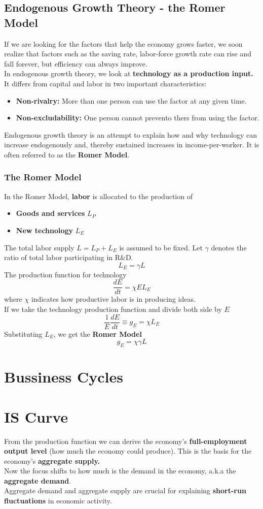 \documentclass[a4paper]{article}
\renewcommand{\sb}{\vspace*{5px} \\}
\begin{document}
\subsection{Endogenous Growth Theory - the Romer Model}
If we are looking for the factors that help the economy grows faster, we soon 
realize that factors such as the saving rate, labor-force growth rate can rise 
and fall forever, but efficiency can always improve. \sb
In endogenous growth theory, we look at \textbf{technology as a 
production input.} It differs from capital and labor in two important 
characteristics: \begin{itemize}
    \item \textbf{Non-rivalry: } More than one person can use the factor 
    at any given time.
    \item \textbf{Non-excludability: } One person cannot prevento thers 
    from using the factor.
\end{itemize}
Endogenous growth theory is an attempt to explain how 
and why technology can increase
endogenously and, thereby sustained increases in income-per-worker. 
It is often referred to as the \textbf{Romer Model}.
\pagebreak

\subsubsection*{The Romer Model}
In the Romer Model, \textbf{labor} is allocated to the production of \begin{itemize}
    \item \textbf{Goods and services} $L_P$
    \item \textbf{New technology} $L_E$
\end{itemize}
The total labor supply $L  = L_P + L_E$ is assumed to be fixed. Let $\gamma$ 
denotes the ratio of total labor participating in R\&D.
\[ L_E = \gamma L \]
The production function for technology
\[ \frac{dE}{dt} = \chi E L_E \]
where $\chi$ indicates how productive labor is in producing ideas. \sb
%
If we take the technology production function and divide both side by $E$
\[ \frac{1}{E}\frac{dE}{dt} \equiv g_E = \chi L_E \]
Substituting $L_E$, we get the \textbf{Romer Model}
\[ \boxed{g_E = \chi \gamma L} \]

\section{Bussiness Cycles}

\section{IS Curve}
From the production function we can derive the economy's 
\textbf{full-employment output level} 
(how much the economy could produce). This is the basis for the 
economy's \textbf{aggregate supply.} \sb
%
Now the focus shifts to how much is the demand in the economy, a.k.a the 
\textbf{aggregate demand}. \sb
%
Aggregate demand and aggregate supply are crucial for explaining \textbf{short-run 
fluctuations} in economic activity.
\end{document}
